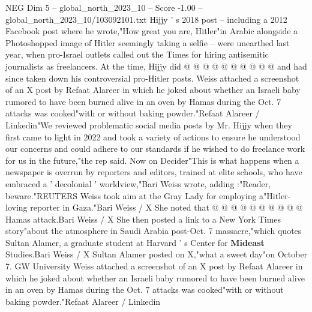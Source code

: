 \begin{textsample}{NEG Dim 5 – global\_north\_2023\_10 – Score -1.00 – global\_north\_2023\_10/103092101.txt}
Hijjy ' s 2018 post -- including a 2012 Facebook post where he wrote,"How great you are, Hitler"in Arabic alongside a Photoshopped image of Hitler seemingly taking a selfie -- were unearthed last year, when pro-Israel outlets called out the Times for hiring antisemitic journalists as freelancers.
At the time, Hijjy did @ @ @ @ @ @ @ @ @ @ and had since taken down his controversial pro-Hitler posts.
Weiss attached a screenshot of an X post by Refaat Alareer in which he joked about whether an Israeli baby rumored to have been burned alive in an oven by Hamas during the Oct. 7 attacks was cooked"with or without baking powder."Refaat Alareer / Linkedin"We reviewed problematic social media posts by Mr.
Hijjy when they first came to light in 2022 and took a variety of actions to ensure he understood our concerns and could adhere to our standards if he wished to do freelance work for us in the future,"the rep said.
Now on Decider"This is what happens when a newspaper is overrun by reporters and editors, trained at elite schools, who have embraced a ' decolonial ' worldview,"Bari Weiss wrote, adding :"Reader, beware."REUTERS Weiss took aim at the Gray Lady for employing a"Hitler-loving reporter in Gaza."Bari Weiss / X She noted that @ @ @ @ @ @ @ @ @ @ Hamas attack.Bari Weiss / X She then posted a link to a New York Times story"about the atmosphere in Saudi Arabia post-Oct. 7 massacre,"which quotes Sultan Alamer, a graduate student at Harvard ' s Center for \textbf{Mideast} Studies.Bari Weiss / X Sultan Alamer posted on X,"what a sweet day"on October 7.
GW University Weiss attached a screenshot of an X post by Refaat Alareer in which he joked about whether an Israeli baby rumored to have been burned alive in an oven by Hamas during the Oct. 7 attacks was cooked"with or without baking powder."Refaat Alareer / Linkedin

\end{textsample}
